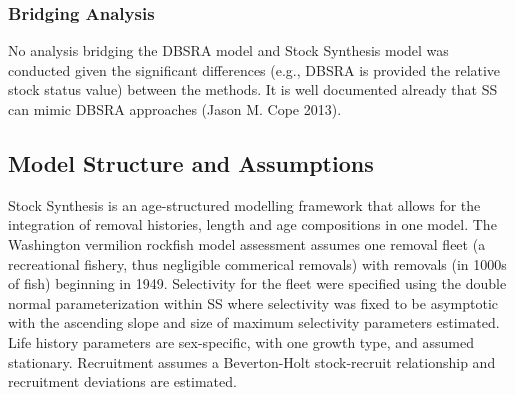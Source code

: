 \documentclass[11pt,
  english,
  a4paper,
]{article}
\begin{document}

\hypertarget{bridging-analysis}{%
\subsubsection{Bridging Analysis}\label{bridging-analysis}}

\leavevmode\tagmcend\tagstructend


No analysis bridging the DBSRA model and Stock Synthesis model was conducted given the significant differences (e.g., DBSRA is provided the relative stock status value) between the methods. It is well documented already that SS can mimic DBSRA approaches {(Jason M. Cope 2013)\leavevmode\tagmcend\tagstructend}.

\leavevmode\tagmcend\tagstructend\par


\hypertarget{model-structure-and-assumptions}{%
\subsection{Model Structure and Assumptions}\label{model-structure-and-assumptions}}

\leavevmode\tagmcend\tagstructend


Stock Synthesis is an age-structured modelling framework that allows for the integration of removal histories, length and age compositions in one model. The Washington vermilion rockfish model assessment assumes one removal fleet (a recreational fishery, thus negligible commerical removals) with removals (in 1000s of fish) beginning in 1949. Selectivity for the fleet were specified using the double normal parameterization within SS where selectivity was fixed to be asymptotic with the ascending slope and size of maximum selectivity parameters estimated. Life history parameters are sex-specific, with one growth type, and assumed stationary. Recruitment assumes a Beverton-Holt stock-recruit relationship and recruitment deviations are estimated.

\leavevmode\tagmcend\tagstructend\par

\end{document}
